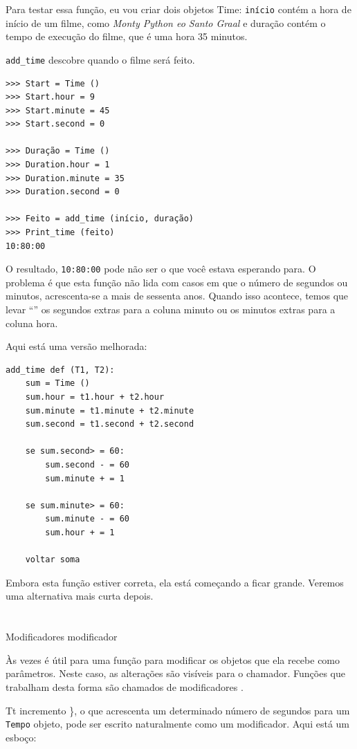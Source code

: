 \documentclass[10pt]{book}
\begin{document}
\begin{exercise}
\begin{v erbatim}
Para testar essa função, eu vou criar dois objetos Time: {\tt início}
contém a hora de início de um filme, como {\em Monty Python eo
Santo Graal} e {duração \tt} contém o tempo de execução do filme,
que é uma hora 35 minutos.

\Verb "add_time" descobre quando o filme será feito.

\begin{verbatim}
>>> Start = Time ()
>>> Start.hour = 9
>>> Start.minute = 45
>>> Start.second = 0

>>> Duração = Time ()
>>> Duration.hour = 1
>>> Duration.minute = 35
>>> Duration.second = 0

>>> Feito = add_time (início, duração)
>>> Print_time (feito)
10:80:00
\end{verbatim}
%
O resultado, {\tt 10:80:00} pode não ser o que você estava esperando
para. O problema é que esta função não lida com casos em que o
número de segundos ou minutos, acrescenta-se a mais de sessenta anos. Quando isso
acontece, temos que levar ``'' os segundos extras para a coluna minuto
ou os minutos extras para a coluna hora.

Aqui está uma versão melhorada:

\begin{verbatim}
add_time def (T1, T2):
    sum = Time ()
    sum.hour = t1.hour + t2.hour
    sum.minute = t1.minute + t2.minute
    sum.second = t1.second + t2.second

    se sum.second> = 60:
        sum.second - = 60
        sum.minute + = 1

    se sum.minute> = 60:
        sum.minute - = 60
        sum.hour + = 1

    voltar soma
\end{verbatim}
%
Embora esta função estiver correta, ela está começando a ficar grande.
Veremos uma alternativa mais curta depois.


\section{} Modificadores
\label{incremento}
\index{} modificador

Às vezes é útil para uma função para modificar os objetos que ela recebe como
parâmetros. Neste caso, as alterações são visíveis para o chamador.
Funções que trabalham desta forma são chamados de modificadores {\bf}.

{Tt incremento \}, o que acrescenta um determinado número de segundos para um {\tt Tempo}
objeto, pode ser escrito naturalmente como um
modificador. Aqui está um esboço:

}
\end{v erbatim}
\end{exercise}
\end{document}
